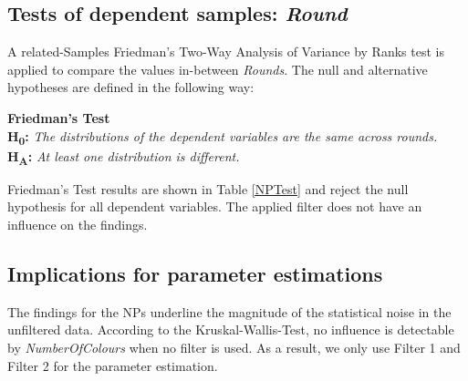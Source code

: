 
\subsection{Tests of dependent samples: \textit{Round}}
A related-Samples Friedman's Two-Way Analysis of Variance by Ranks test \citep{Friedman1937} is applied to compare the values in-between \textit{Rounds}. The null and alternative hypotheses are defined in the following way:

\textbf{Friedman's Test} \\ 
\textbf{H\textsubscript{0}:} \textit{The distributions of the dependent variables are the same across rounds.}\\
\textbf{H\textsubscript{A}:} \textit{At least one distribution is different.}

Friedman's Test results are shown in Table \ref{NPTest} and reject the null hypothesis for all dependent variables. The applied filter does not have an influence on the findings.

\subsection{Implications for parameter estimations}
The findings for the \ac{NP}s underline the magnitude of the statistical noise in the unfiltered data. According to the Kruskal-Wallis-Test, no influence is detectable by \textit{NumberOfColours} when no filter is used. As a result, we only use Filter 1 and Filter 2 for the parameter estimation.

